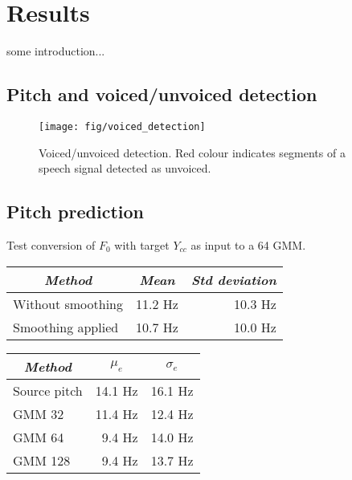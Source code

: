 \chapter{Results} %
\label{cha:results}

some introduction...

\section{Pitch and voiced/unvoiced detection} %
\label{sec:pitch_and_voiced_unvoiced_detection}
\begin{figure}[htbp]
	\begin{center}
		\texttt{[image: fig/voiced\_detection]}
		\caption{Voiced/unvoiced detection. Red colour indicates segments of a speech signal detected as unvoiced.}
		\label{fig:voiced_detection}
	\end{center}
\end{figure}





\section{Pitch prediction} %
\label{sec:pitch_prediction}
Test conversion of $F_0$ with target $Y_{cc}$ as input to a 64 GMM.
\begin{table}[htbp]
	\begin{center}
		\begin{tabular}{lrr}
			\toprule
			\multicolumn{1}{c}{\emph{Method}} & \multicolumn{1}{c}{\emph{Mean}} & \multicolumn{1}{c}{\emph{Std deviation}} \\
			\midrule
			Without smoothing & 11.2 Hz & 10.3 Hz\\
			Smoothing applied & 10.7 Hz & 10.0 Hz \\
			\bottomrule			
		\end{tabular}		
	\end{center}
\label{tab:pitch_prediction_with_target_cempstrum_as_input}	
\end{table}

\begin{table}[htbp]
	\begin{center}
		\begin{tabular}{lrr}
			\toprule
			\multicolumn{1}{c}{\emph{Method}} & \multicolumn{1}{c}{$\mu_e$} & \multicolumn{1}{c}{$\sigma_e$}\\
			\midrule
			Source pitch & 14.1 Hz & 16.1 Hz\\
			GMM 32 & 11.4 Hz  & 12.4 Hz\\
			GMM 64 & 9.4 Hz  & 14.0 Hz\\
			GMM 128 & 9.4 Hz & 13.7 Hz\\
			\bottomrule			
		\end{tabular}		
	\end{center}
\label{tab:pitch_prediction_transformed}	
\end{table}

